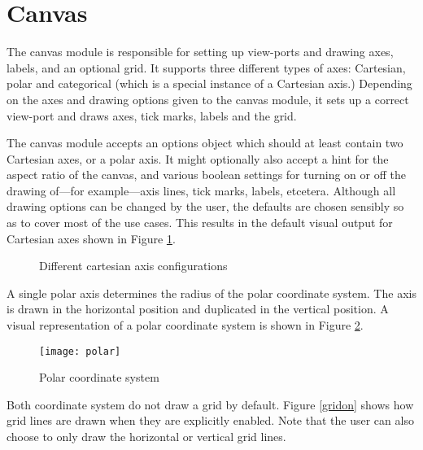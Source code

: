 \section{Canvas}
The canvas module is responsible for setting up view-ports and drawing axes, labels, and an optional grid. It supports three different types of axes: Cartesian, polar and categorical (which is a special instance of a Cartesian axis.) Depending on the axes and drawing options given to the canvas module, it sets up a correct view-port and draws axes, tick marks, labels and the grid. 

The canvas module accepts an options object which should at least contain two Cartesian axes, or a polar axis. It might optionally also accept a hint for the aspect ratio of the canvas, and various boolean settings for turning on or off the drawing of---for example---axis lines, tick marks, labels, etcetera. Although all drawing options can be changed by the user, the defaults are chosen sensibly so as to cover most of the use cases. This results in the  default visual output for Cartesian axes shown in Figure \ref{cartesianaxes}.

\begin{figure}[h!]
  \centering
  \hspace{10pt}
  \hspace{10pt}
  \caption{Different cartesian axis configurations}
  \label{cartesianaxes}
\end{figure}

A single polar axis determines the radius of the polar coordinate system. The axis is drawn in the horizontal position and duplicated in the vertical position. A visual representation of a polar coordinate system is shown in Figure \ref{polar}.

\begin{figure}[h!]
\centering
\texttt{[image: polar]}
\caption{Polar coordinate system}
\label{polar}
\end{figure}

Both coordinate system do not draw a grid by default. Figure \ref{gridon} shows how grid lines are drawn when they are explicitly enabled. Note that the user can also choose to only draw the horizontal or vertical grid lines.

